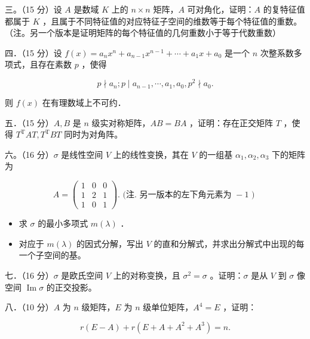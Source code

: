 \documentclass{article}
\begin{document}
三。（15 分）设 \(A\) 是数域 \(K\) 上的 \(n \times n\) 矩阵，\(A\) 可对角化，证明：\(A\) 的复特征值都属于 \(K\) ，且属于不同特征值的对应特征子空间的维数等于每个特征值的重数。（注。另一个版本是证明矩阵的每个特征值的几何重数小于等于代数重数）

四．（15 分）设 \(f(x)=a_{n} x^{n}+a_{n-1} x^{n-1}+\cdots+a_{1} x+a_{0}\) 是一个 \(n\) 次整系数多项式，且存在素数 \(p\) ，使得

\[
p \nmid a_{n} ; p \mid a_{n-1}, \cdots, a_{1}, a_{0}, p^{2} \nmid a_{0} .
\]

则 \(f(x)\) 在有理数域上不可约．

五．（15 分）\(A, B\) 是 \(n\) 级实对称矩阵，\(A B=B A\) ，证明：存在正交矩阵 \(T\) ，使得 \(T^{\mathrm{T}} A T, T^{\mathrm{T}} B T\) 同时为对角阵。

六。（16 分）\(\sigma\) 是线性空间 \(V\) 上的线性变换，其在 \(V\) 的一组基 \(\alpha_{1}, \alpha_{2}, \alpha_{3}\) 下的矩阵为

\[
A=\left(\begin{array}{lll}
1 & 0 & 0 \\
1 & 2 & 1 \\
1 & 0 & 1
\end{array}\right) . \text { (注. 另一版本的左下角元素为 }-1 \text { ) }
\]

\begin{itemize}
  \item[（1）] 求 \(\sigma\) 的最小多项式 \(m(\lambda)\) ．
  \item[（2）] 对应于 \(m(\lambda)\) 的因式分解，写出 \(V\) 的直和分解式，并求出分解式中出现的每一个子空间的基。
\end{itemize}

七．（16 分）\(\sigma\) 是欧氏空间 \(V\) 上的对称变换，且 \(\sigma^{2}=\sigma\) 。证明：\(\sigma\) 是从 \(V\) 到 \(\sigma\) 像空间 \(\operatorname{Im} \sigma\) 的正交投影。

八．（10 分）\(A\) 为 \(n\) 级矩阵，\(E\) 为 \(n\) 级单位矩阵，\(A^{4}=E\) ，证明：

\[
r(E-A)+r\left(E+A+A^{2}+A^{3}\right)=n .
\]
\end{document}
